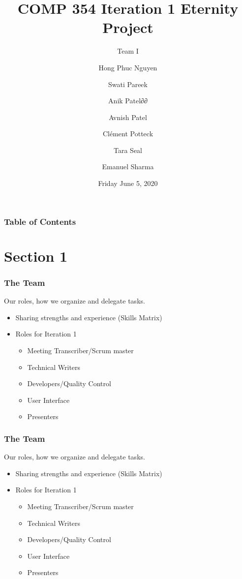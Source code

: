 \documentclass{beamer}
\title{COMP 354 Iteration 1 Eternity Project}
\subtitle{Team I}
\author
{Hong Phuc Nguyen 
\and Swati Pareek 
\and Anik Patel∂∂
\and Avnish Patel 
\and Clément Potteck 
\and Tara Seal 
\and Emanuel Sharma
}
\institute{Concordia University}
\date{Friday June 5, 2020}
\begin{document}
\frame{\titlepage}
\begin{frame}
\frametitle{Table of Contents}
\tableofcontents
\end{frame}
\section{Section 1}
\begin{frame}
\frametitle{The Team}
Our roles, how we organize and delegate tasks.
\begin{itemize}
\item Sharing strengths and experience (Skills Matrix)
\item Roles for Iteration 1
\begin{itemize}
\item Meeting Transcriber/Scrum master
\item Technical Writers
\item Developers/Quality Control
\item User Interface
\item Presenters
\end{itemize}
\end{itemize}
\end{frame}
\begin{frame}
\frametitle{The Team}
Our roles, how we organize and delegate tasks.
\begin{itemize}
\item Sharing strengths and experience (Skills Matrix)
\item Roles for Iteration 1
\begin{itemize}
\item Meeting Transcriber/Scrum master
\item Technical Writers
\item Developers/Quality Control
\item User Interface
\item Presenters
\end{itemize}
\end{itemize}
\end{frame}
\end{document}
